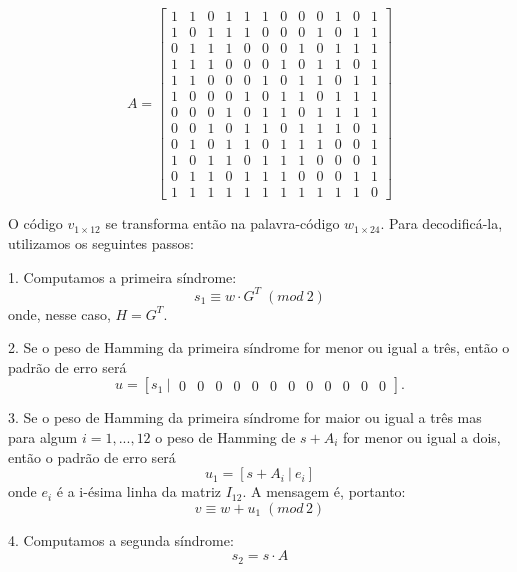 \documentclass[%
aip,
jmp,%
amsmath,amssymb,
reprint,%
]{revtex4-1}
\begin{document}
	\begin{equation}
		A = \left[\begin{array}{cccccccccccc}
		1&1&0&1&1&1&0&0&0&1&0&1 \\
		1&0&1&1&1&0&0&0&1&0&1&1 \\
		0&1&1&1&0&0&0&1&0&1&1&1 \\
		1&1&1&0&0&0&1&0&1&1&0&1 \\
		1&1&0&0&0&1&0&1&1&0&1&1 \\
		1&0&0&0&1&0&1&1&0&1&1&1 \\
		0&0&0&1&0&1&1&0&1&1&1&1 \\
		0&0&1&0&1&1&0&1&1&1&0&1 \\
		0&1&0&1&1&0&1&1&1&0&0&1 \\
		1&0&1&1&0&1&1&1&0&0&0&1 \\
		0&1&1&0&1&1&1&0&0&0&1&1 \\
		1&1&1&1&1&1&1&1&1&1&1&0
		\end{array}
		\right]
	\end{equation}
	
	O código $v_{1\times12}$ se transforma então na palavra-código $w_{1\times24}$. Para decodificá-la, utilizamos os seguintes passos:
	
	1. Computamos a primeira síndrome:
	\begin{equation}
		s_{1} \equiv w\cdot G^{T}\;(mod\:2)
	\end{equation}
	onde, nesse caso, $H=G^{T}$.
	
	2. Se o peso de Hamming da primeira síndrome for  menor ou igual a três, então o padrão de erro será
	\begin{equation}
		u = \left[s_{1}\:|\:\begin{array}{cccccccccccc}
	0&0&0&0&0&0&0&0&0&0&0&0
	\end{array}\right].
	\end{equation}
	
	3. Se o peso de Hamming da primeira síndrome for maior ou igual a três mas para algum $i=1,...,12$ o peso de Hamming de $s+A_{i}$ for menor ou igual a dois, então o padrão de erro será
	\begin{equation}
		u_1=\left[s+A_{i}\:|\:e_{i}\right]
	\end{equation}
	onde $e_i$ é a i-ésima linha da matriz $I_{12}$. A mensagem é, portanto:
	\begin{equation}
	v \equiv w+u_1\; (mod\, 2)
	\end{equation}
	
	4. Computamos a segunda síndrome:
	\begin{equation}
		s_2 = s\cdot A
	\end{equation}
	
\end{document}
